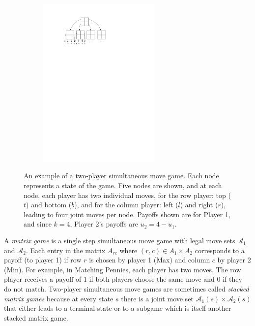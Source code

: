 \documentclass[conference]{IEEEtran}
\newcommand{\cA}{\mathcal{A}}
\begin{document}
\begin{figure}[t!]
\centering
\begin{subfigure}{6cm}
\centering
\includegraphics[width=6.0cm]{figures/tree2}\\
\end{subfigure}
\caption{An example of a two-player simultaneous move game. Each node represents a state of 
the game. Five nodes are shown, and at each node, each player has two individual moves, for the row player: top ($t$) and bottom ($b$), 
and for the column player: left ($l$) and right ($r$), leading to four joint moves per node.
Payoffs shown are for Player 1, and since $k = 4$, Player 2's payoffs are $u_2 = 4 - u_1$. 
\label{fig:example}}
\end{figure}

A {\it matrix game} is a single step simultaneous move game with legal move sets $\cA_1$ and $\cA_2$. 
Each entry in the matrix $A_{rc}$ where $(r,c) \in A_1 \times A_2$ corresponds to a payoff (to player 1) if row $r$ is chosen by 
player 1 (Max) and column $c$ by player 2 (Min). 
For example, in Matching Pennies, each player has two moves. The row player receives a payoff of 1 if both 
players choose the same move and 0 if they do not match. 
Two-player simultaneous move games are sometimes called {\it stacked matrix games} because at every state 
$s$ there is a joint move set $\cA_1(s) \times \cA_2(s)$ that either leads to a terminal state or to a subgame which 
is itself another stacked matrix game. 
\end{document}

